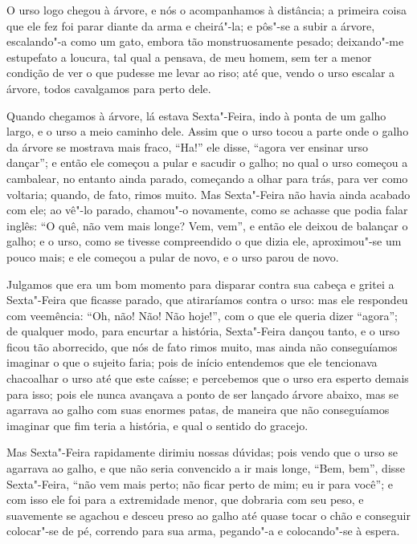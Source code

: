 O urso logo chegou à árvore, e nós o acompanhamos à distância; a
primeira coisa que ele fez foi parar diante da arma e cheirá"-la; e
pôs"-se a subir a árvore, escalando"-a como um gato, embora tão
monstruosamente pesado; deixando"-me estupefato a loucura, tal qual a
pensava, de meu homem, sem ter a menor condição de ver o que pudesse me
levar ao riso; até que, vendo o urso escalar a árvore, todos cavalgamos
para perto dele.

Quando chegamos à árvore, lá estava Sexta"-Feira, indo à ponta de um
galho largo, e o urso a meio caminho dele. Assim que o urso tocou a
parte onde o galho da árvore se mostrava mais fraco, ``Ha!'' ele disse,
``agora ver ensinar urso dançar''; e então ele começou a pular e sacudir
o galho; no qual o urso começou a cambalear, no entanto ainda parado,
começando a olhar para trás, para ver como voltaria; quando, de fato,
rimos muito. Mas Sexta"-Feira não havia ainda acabado com ele; ao vê"-lo
parado, chamou"-o novamente, como se achasse que podia falar inglês: ``O
quê, não vem mais longe? Vem, vem'', e então ele deixou de balançar o
galho; e o urso, como se tivesse compreendido o que dizia ele,
aproximou"-se um pouco mais; e ele começou a pular de novo, e o urso
parou de novo.

Julgamos que era um bom momento para disparar contra sua cabeça e gritei
a Sexta"-Feira que ficasse parado, que atiraríamos contra o urso: mas ele
respondeu com veemência: ``Oh, não! Não! Não hoje!'', com o que ele
queria dizer ``agora''; de qualquer modo, para encurtar a história,
Sexta"-Feira dançou tanto, e o urso ficou tão aborrecido, que nós de fato
rimos muito, mas ainda não conseguíamos imaginar o que o sujeito faria;
pois de início entendemos que ele tencionava chacoalhar o urso até que
este caísse; e percebemos que o urso era esperto demais para isso; pois
ele nunca avançava a ponto de ser lançado árvore abaixo, mas se agarrava
ao galho com suas enormes patas, de maneira que não conseguíamos
imaginar que fim teria a história, e qual o sentido do gracejo.

Mas Sexta"-Feira rapidamente dirimiu nossas dúvidas; pois vendo que o
urso se agarrava ao galho, e que não seria convencido a ir mais longe,
``Bem, bem'', disse Sexta"-Feira, ``não vem mais perto; não ficar perto
de mim; eu ir para você''; e com isso ele foi para a extremidade menor,
que dobraria com seu peso, e suavemente se agachou e desceu preso ao
galho até quase tocar o chão e conseguir colocar"-se de pé, correndo para
sua arma, pegando"-a e colocando"-se à espera.

